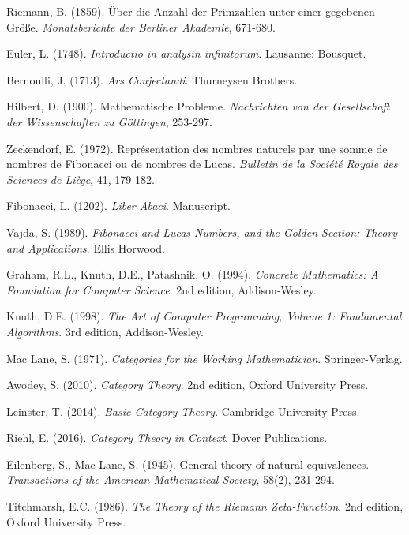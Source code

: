 \documentclass[12pt]{article}
\theoremstyle{plain}
\theoremstyle{definition}
\begin{document}
\begin{thebibliography}{99}

 Riemann, B. (1859). Über die Anzahl der Primzahlen unter einer gegebenen Größe. \emph{Monatsberichte der Berliner Akademie}, 671-680.

 Euler, L. (1748). \emph{Introductio in analysin infinitorum}. Lausanne: Bousquet.

 Bernoulli, J. (1713). \emph{Ars Conjectandi}. Thurneysen Brothers.

 Hilbert, D. (1900). Mathematische Probleme. \emph{Nachrichten von der Gesellschaft der Wissenschaften zu Göttingen}, 253-297.

 Zeckendorf, E. (1972). Représentation des nombres naturels par une somme de nombres de Fibonacci ou de nombres de Lucas. \emph{Bulletin de la Société Royale des Sciences de Liège}, 41, 179-182.

 Fibonacci, L. (1202). \emph{Liber Abaci}. Manuscript.

 Vajda, S. (1989). \emph{Fibonacci and Lucas Numbers, and the Golden Section: Theory and Applications}. Ellis Horwood.

 Graham, R.L., Knuth, D.E., Patashnik, O. (1994). \emph{Concrete Mathematics: A Foundation for Computer Science}. 2nd edition, Addison-Wesley.

 Knuth, D.E. (1998). \emph{The Art of Computer Programming, Volume 1: Fundamental Algorithms}. 3rd edition, Addison-Wesley.

 Mac Lane, S. (1971). \emph{Categories for the Working Mathematician}. Springer-Verlag.

 Awodey, S. (2010). \emph{Category Theory}. 2nd edition, Oxford University Press.

 Leinster, T. (2014). \emph{Basic Category Theory}. Cambridge University Press.

 Riehl, E. (2016). \emph{Category Theory in Context}. Dover Publications.

 Eilenberg, S., Mac Lane, S. (1945). General theory of natural equivalences. \emph{Transactions of the American Mathematical Society}, 58(2), 231-294.

 Titchmarsh, E.C. (1986). \emph{The Theory of the Riemann Zeta-Function}. 2nd edition, Oxford University Press.


\end{thebibliography}
\end{document}
